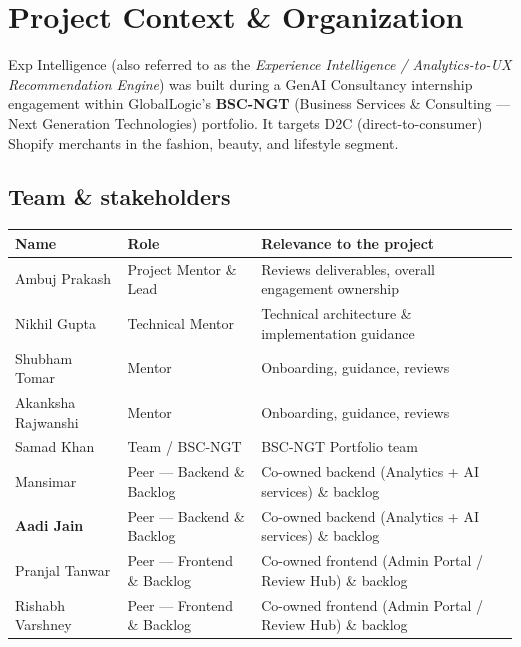 \documentclass[11pt,a4paper]{article}
\begin{document}
\section{Project Context \& Organization}

Exp Intelligence (also referred to as the \emph{Experience Intelligence /
Analytics-to-UX Recommendation Engine}) was built during a GenAI Consultancy
internship engagement within GlobalLogic's \textbf{BSC-NGT} (Business Services
\& Consulting --- Next Generation Technologies) portfolio. It targets D2C
(direct-to-consumer) Shopify merchants in the fashion, beauty, and lifestyle
segment.

\subsection{Team \& stakeholders}

\begin{center}
\begin{tabularx}{\textwidth}{@{}l l Y@{}}
\toprule
\textbf{Name} & \textbf{Role} & \textbf{Relevance to the project}\\
\midrule
Ambuj Prakash & Project Mentor \& Lead & Reviews deliverables, overall engagement ownership\\
Nikhil Gupta & Technical Mentor & Technical architecture \& implementation guidance\\
Shubham Tomar & Mentor & Onboarding, guidance, reviews\\
Akanksha Rajwanshi & Mentor & Onboarding, guidance, reviews\\
Samad Khan & Team / BSC-NGT & BSC-NGT Portfolio team\\
Mansimar & Peer --- Backend \& Backlog & Co-owned backend (Analytics + AI services) \& backlog\\
\textbf{Aadi Jain} & Peer --- Backend \& Backlog & Co-owned backend (Analytics + AI services) \& backlog\\
Pranjal Tanwar & Peer --- Frontend \& Backlog & Co-owned frontend (Admin Portal / Review Hub) \& backlog\\
Rishabh Varshney & Peer --- Frontend \& Backlog & Co-owned frontend (Admin Portal / Review Hub) \& backlog\\
\bottomrule
\end{tabularx}
\end{center}
\end{document}
